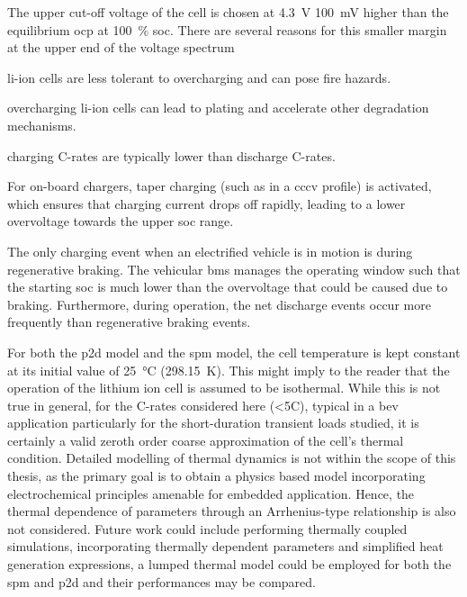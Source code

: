 The  upper   cut-off  voltage   of  the  cell   is  chosen   at  \SI{4.3}{\volt}
\ie{}  \approx\SI{100}{\milli\volt} higher  than  the  equilibrium \gls{ocp}  at
\SI{100}{\percent} \gls{soc}. There are several  reasons for this smaller margin
at the upper end of the voltage spectrum
\begin{description}[leftmargin=!,labelwidth=\widthof{\bfseries low
    probabilities},itemsep=1ex]

\item[safety] li-ion  cells are less  tolerant to overcharging and  can pose
    fire hazards.

\item[degradation]  overcharging  li-ion  cells  can  lead  to  plating  and
    accelerate other degradation mechanisms.

\item[low  C-rates]  charging C-rates  are  typically  lower than  discharge
    C-rates.

\item[CCCV charging]  For on-board  chargers, taper charging  (such as  in a
    \gls{cccv} profile) is activated, which  ensures that charging current drops
    off  rapidly, leading  to a  lower overvoltage  towards the  upper \gls{soc}
    range.

\item[low probabilities] The only charging event when an electrified vehicle
    is in motion is during regenerative braking. The vehicular \gls{bms} manages
    the operating window such that the starting \gls{soc} is much lower than the
    overvoltage  that  could  be  caused due  to  braking.  Furthermore,  during
    operation, the net discharge events  occur more frequently than regenerative
    braking events.

\end{description}

For  both the  \gls{p2d} model  and the  \gls{spm} model,  the cell  temperature
is   kept   constant   at   its   initial   value   of   \SI{25}{\degreeCelsius}
(\SI{298.15}{\kelvin}). This might imply to the reader that the operation of the
lithium ion cell is assumed to be isothermal. While this is not true in general,
for  the C-rates  considered  here  (<5C), typical  in  a \gls{bev}  application
particularly for the  short-duration transient loads studied, it  is certainly a
valid  zeroth  order  coarse  approximation of  the  cell's  thermal  condition.
Detailed  modelling  of  thermal  dynamics  is not  within  the  scope  of  this
thesis, as  the primary goal  is to obtain  a physics based  model incorporating
electrochemical principles amenable for embedded application. Hence, the thermal
dependence  of parameters  through an  Arrhenius-type relationship  is also  not
considered. Future work could  include performing thermally coupled simulations,
\ie{}  incorporating   thermally  dependent   parameters  and   simplified  heat
generation expressions, \eg{} a lumped thermal  model could be employed for both
the \gls{spm} and \gls{p2d} and their performances may be compared.

